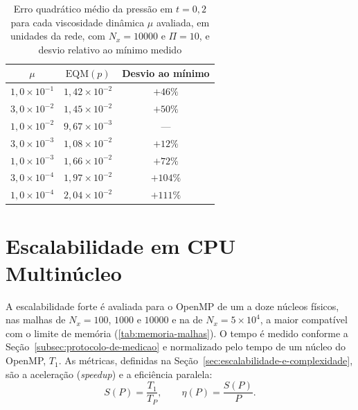 \begin{table}[H]
    \centering
    \caption{Erro quadrático médio da pressão em \(t = 0{,}2\) para cada viscosidade dinâmica \(\mu\) avaliada, em unidades da rede, com \(N_x=10000\) e \(\Pi=10\), e desvio relativo ao mínimo medido}
    \label{tab:erro-viscosidade}
    \begin{tabular}{ccc}
        \toprule
        \(\mu\) & \(\mathrm{EQM}(p)\) & Desvio ao mínimo \\
        \midrule
        \(1{,}0\times10^{-1}\) & \(1{,}42\times10^{-2}\) & \(+46\%\) \\
        \(3{,}0\times10^{-2}\) & \(1{,}45\times10^{-2}\) & \(+50\%\) \\
        \(1{,}0\times10^{-2}\) & \(9{,}67\times10^{-3}\) & --- \\
        \(3{,}0\times10^{-3}\) & \(1{,}08\times10^{-2}\) & \(+12\%\) \\
        \(1{,}0\times10^{-3}\) & \(1{,}66\times10^{-2}\) & \(+72\%\) \\
        \(3{,}0\times10^{-4}\) & \(1{,}97\times10^{-2}\) & \(+104\%\) \\
        \(1{,}0\times10^{-4}\) & \(2{,}04\times10^{-2}\) & \(+111\%\) \\
        \bottomrule
    \end{tabular}
\end{table}



\section{Escalabilidade em CPU Multinúcleo}\label{sec:escalabilidade-em-cpu-multinucleo}

A escalabilidade forte é avaliada para o OpenMP de um a doze núcleos físicos, nas malhas de \(N_x = 100\), \(1000\) e \(10000\) e na de \(N_x = 5 \times 10^4\), a maior compatível com o limite de memória (\autoref{tab:memoria-malhas}).
O tempo é medido conforme a Seção~\ref{subsec:protocolo-de-medicao} e normalizado pelo tempo de um núcleo do OpenMP, \(T_1\).
As métricas, definidas na Seção~\ref{sec:escalabilidade-e-complexidade}, são a aceleração (\textit{speedup}) e a eficiência paralela:
\[
S(P)=\frac{T_1}{T_P},\qquad
\eta(P)=\frac{S(P)}{P}.
\]


